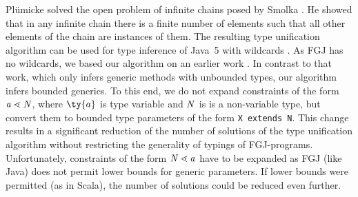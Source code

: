 Pl\"umicke \cite{plue09_1} solved the open problem of infinite chains
posed by Smolka \cite{GS89}.
He showed that in any infinite chain there is a finite number of elements such that
all other elements of the chain are instances of them. The resulting type
unification algorithm can be used for type inference of Java~5 with
wildcards \cite{Plue07_3}. As FGJ has no wildcards, we based our
algorithm on an earlier work \cite{Plue04_1}.
In contrast to that work, which only infers generic methods with
unbounded types, our algorithm  infers bounded generics.
To this end, we do not expand constraints
of the form $\mathit{ a } \lessdot \mathit{N}$, where $\ty{a}$ is type variable and $\mathit{N}$ is is a
non-variable type, but convert them to bounded type parameters of the form
\texttt{X extends N}. This change results in a significant reduction
of the number of solutions of the type
unification algorithm without restricting the generality of typings of
FGJ-programs. Unfortunately, constraints of the form $\mathit{N} \lessdot \mathit{ a }$ have
to be expanded as FGJ (like Java) does not permit lower bounds for
generic parameters. If lower bounds were permitted  (as in Scala), the
number of solutions could be reduced even further.


